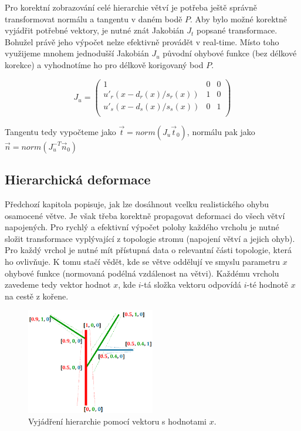 Pro korektní zobrazování celé hierarchie větví je potřeba ještě správně transformovat normálu a tangentu v daném bodě $P$. Aby bylo možné korektně vyjádřit potřebné vektory, je nutné znát Jakobián $J_t$ popsané transformace. Bohužel právě jeho výpočet nelze efektivně provádět v real-time. Místo toho využijeme mnohem jednodušší Jakobián $J_u$ původní ohybové funkce (bez délkové korekce) a vyhodnotíme ho pro délkově korigovaný bod $P$.

\begin{equation}
J_{u} = \begin{pmatrix}
1 & 0 &0 \\
{u}'_r(x-d_r(x)/s_r(x)) & 1 & 0\\
{u}'_s(x-d_s(x)/s_s(x)) & 0 & 1\\
\end{pmatrix}
\end{equation}

Tangentu tedy vypočteme jako $\vec{t} = norm(J_{u}\vec{t}_{0})$, normálu pak jako $\vec{n} = norm(J_{u}^{-T}\vec{n}_{0})$

\subsection{Hierarchická deformace}

Předchozí kapitola popisuje, jak lze dosáhnout vcelku realistického ohybu osamocené větve. Je však třeba korektně propagovat deformaci do všech větví napojených. Pro rychlý a efektivní výpočet polohy každého vrcholu je nutné složit transformace vyplývající z topologie stromu (napojení větví a jejich ohyb). Pro každý vrchol je nutné mít přístupná data o relevantní části topologie, která ho ovlivňuje. K tomu stačí vědět, kde se větve oddělují ve smyslu parametru $x$ ohybové funkce (normovaná podélná vzdálenost na větvi). Každému vrcholu zavedeme tedy vektor hodnot $x$, kde $i$-tá složka vektoru odpovídá $i$-té hodnotě $x$ na cestě z kořene.
 
\begin{figure}[!hbt]
\begin{center}
\includegraphics[width=0.5\textwidth]{./figures/branchHierarchy.png}
\end{center}
\caption{ Vyjádření hierarchie pomocí vektoru s hodnotami $x$.
\label{fig:hierarchyCoords}
}
\end{figure}

